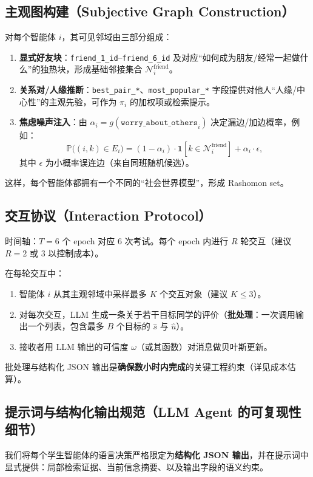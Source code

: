 \documentclass[UTF8, a4paper, 11pt]{ctexart}
\begin{document}
\subsection{主观图构建（Subjective Graph Construction）}
对每个智能体 \(i\)，其可见邻域由三部分组成：
\begin{enumerate}
    \item \textbf{显式好友块}：\texttt{friend\_1\_id}--\texttt{friend\_6\_id} 及对应“如何成为朋友/经常一起做什么”的独热块，形成基础邻接集合 \(\mathcal{N}_i^{\text{friend}}\)。
    \item \textbf{关系对/人缘推断}：\texttt{best\_pair\_*}、\texttt{most\_popular\_*} 字段提供对他人“人缘/中心性”的主观先验，可作为 \(\pi_i\) 的加权项或检索提示。
    \item \textbf{焦虑噪声注入}：由 \(\alpha_i=g(\texttt{worry\_about\_others}_i)\) 决定漏边/加边概率，例如：
    \[
    \mathbb{P}\big((i,k)\in E_i\big)= (1-\alpha_i)\cdot \mathbf{1}[k\in \mathcal{N}_i^{\text{friend}}] + \alpha_i \cdot \epsilon,
    \]
    其中 \(\epsilon\) 为小概率误连边（来自同班随机候选）。
\end{enumerate}
这样，每个智能体都拥有一个不同的“社会世界模型”，形成 Rashomon set。

\subsection{交互协议（Interaction Protocol）}
时间轴：\(T=6\) 个 epoch 对应 6 次考试。每个 epoch 内进行 \(R\) 轮交互（建议 \(R=2\) 或 \(3\) 以控制成本）。

在每轮交互中：
\begin{enumerate}
    \item 智能体 \(i\) 从其主观邻域中采样最多 \(K\) 个交互对象（建议 \(K\le 3\)）。
    \item 对每次交互，LLM 生成一条关于若干目标同学的评价（\textbf{批处理}：一次调用输出一个列表，包含最多 \(B\) 个目标的 \(\hat{s}\) 与 \(\hat{u}\)）。
    \item 接收者用 LLM 输出的可信度 \(\omega\)（或其函数）对消息做贝叶斯更新。
\end{enumerate}
批处理与结构化 JSON 输出是\textbf{确保数小时内完成}的关键工程约束（详见成本估算）。

\subsection{提示词与结构化输出规范（LLM Agent 的可复现性细节）}
我们将每个学生智能体的语言决策严格限定为\textbf{结构化 JSON 输出}，并在提示词中显式提供：局部检索证据、当前信念摘要、以及输出字段的语义约束。
\end{document}
